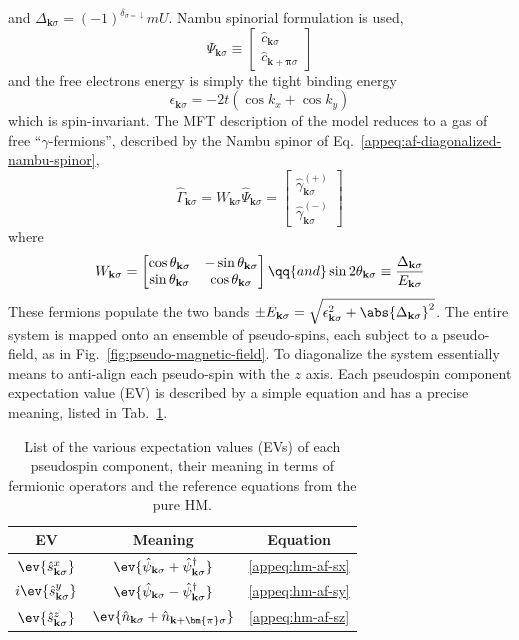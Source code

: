 and $\Delta_{\mathbf{k}\sigma} = (-1)^{\delta_{\sigma=\downarrow}}mU$. Nambu spinorial formulation is used,
\[
\hat \Psi_{\mathbf{k}\sigma} \equiv \begin{bmatrix}
	\hat c_{\mathbf{k}\sigma} \\
	\hat c_{\mathbf{k}+\bm{\pi}\sigma} 
\end{bmatrix}
\]
and the free electrons energy is simply the tight binding energy
\[
	\epsilon_{\mathbf{k}\sigma} = -2t \left(
		\cos k_x + \cos k_y
	\right)
\]
which is spin-invariant. The MFT description of the model reduces to a gas of free ``$\gamma$-fermions'', described by the Nambu spinor of Eq.~\eqref{appeq:af-diagonalized-nambu-spinor},
\[
	\hat\Gamma_{\mathbf{k}\sigma} = W_{\mathbf{k}\sigma} \hat \Psi_{\mathbf{k}\sigma} = \begin{bmatrix}
		\hat \gamma_{\mathbf{k}\sigma}^{(+)} \\ \hat \gamma_{\mathbf{k}\sigma}^{(-)}
	\end{bmatrix}
\]
where
\[
	W_{\mathbf{k}\sigma} = \begin{bmatrix}
		\cos \theta_{\mathbf{k}\sigma} & - \sin \theta_{\mathbf{k}\sigma} \\
		\sin \theta_{\mathbf{k}\sigma} & \cos \theta_{\mathbf{k}\sigma}
	\end{bmatrix}
	\qq{and}
	\sin 2\theta_{\mathbf{k}\sigma} \equiv \frac{\Delta_{\mathbf{k}\sigma}}{E_{\mathbf{k}\sigma}}
\]
These fermions populate the two bands $\pm E_{\mathbf{k}\sigma} = \sqrt{\epsilon_{\mathbf{k}\sigma}^2 + \abs{\Delta_{\mathbf{k}\sigma}}^2}$. The entire system is mapped onto an ensemble of pseudo-spins, each subject to a pseudo-field, as in Fig.~\ref{fig:pseudo-magnetic-field}. To diagonalize the system essentially means to anti-align each pseudo-spin with the $z$ axis. Each pseudospin component expectation value (EV) is described by a simple equation and has a precise meaning, listed in Tab.~\ref{tab:af-pseudospin-map}.

\begin{table}
	\centering
	\begin{tabular}{c c c}
		\textbf{EV} & \textbf{Meaning} & \textbf{Equation} \\
		\midrule
		$\ev{\hat s_{\mathbf{k}\sigma}^x}$ & $\ev{
			\hat \psi_{\mathbf{k}\sigma}
			+ \hat \psi_{\mathbf{k}\sigma}^\dagger
		}$ & \eqref{appeq:hm-af-sx} \\[0.7em]
		$i\ev{\hat s_{\mathbf{k}\sigma}^y}$ & $\ev{
			\hat \psi_{\mathbf{k}\sigma}
			- \hat \psi_{\mathbf{k}\sigma}^\dagger
		}$ & \eqref{appeq:hm-af-sy} \\[0.7em]
		$\ev{\hat s_{\mathbf{k}\sigma}^z}$ & $\ev{
			\hat n_{\mathbf{k}\sigma}
			+ \hat n_{\mathbf{k}+\bm{\pi}\sigma}
		}$ & \eqref{appeq:hm-af-sz} \\
		\midrule
	\end{tabular}
	\caption{List of the various expectation values (EVs) of each pseudospin component, their meaning in terms of fermionic operators and the reference equations from the pure HM.}
	\label{tab:af-pseudospin-map}
\end{table}

